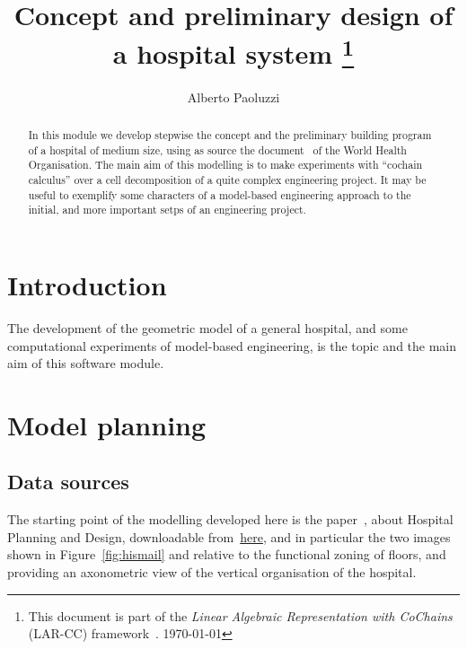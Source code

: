 \documentclass[11pt,oneside]{article}    %
\title{Concept and preliminary design of a hospital system
\footnote{This document is part of the \emph{Linear Algebraic Representation with CoChains} (LAR-CC) framework~\cite{cclar-proj:2013:00}. \today}
}
\author{Alberto Paoluzzi}
\begin{document}
\maketitle
\nonstopmode
\tableofcontents

\begin{abstract}
In this module we develop stepwise the concept and the preliminary building program of a hospital of medium size, using as source the document~\cite{who:2013} of the World Health Organisation. The main aim of this modelling is to make experiments with ``cochain calculus'' over a cell decomposition of a quite complex engineering project. It may be useful to exemplify some characters of a model-based engineering approach to the initial, and more important setps of an engineering project.
\end{abstract}

\section{Introduction}

The development of the geometric model of a general hospital, and some computational experiments of model-based engineering, is the topic and the main aim of this software module.

\section{Model planning}

\subsection{Data sources}

The starting point of the modelling developed here is the paper~\cite{who:2013}, about Hospital Planning and Design, downloadable from~\href{http://paoluzzi.dia.uniroma3.it/web/hospital-planning-and-design.pdf}{here}, and in particular the two images shown in Figure~\ref{fig:hismail} and relative to the functional zoning of floors, and providing an axonometric view of the vertical organisation of the hospital.
\end{document}
